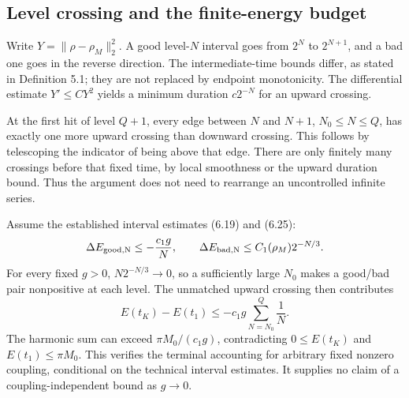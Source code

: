 \documentclass[10pt]{article}
\begin{document}
\subsection*{Level crossing and the finite-energy budget}
Write \(Y=\|\rho-\rho_M\|_2^2\). A good level-\(N\) interval goes from \(2^N\) to \(2^{N+1}\), and a bad one goes in the reverse direction. The intermediate-time bounds differ, as stated in Definition 5.1; they are not replaced by endpoint monotonicity. The differential estimate \(Y'\le CY^2\) yields a minimum duration \(c2^{-N}\) for an upward crossing.\par
At the first hit of level \(Q+1\), every edge between \(N\) and \(N+1\), \(N_0\le N\le Q\), has exactly one more upward crossing than downward crossing. This follows by telescoping the indicator of being above that edge. There are only finitely many crossings before that fixed time, by local smoothness or the upward duration bound. Thus the argument does not need to rearrange an uncontrolled infinite series.\par
Assume the established interval estimates (6.19) and (6.25): \[\Delta E_{\rm good,N}\le-\frac{c_1g}{N},\qquad
 \Delta E_{\rm bad,N}\le C_1(\rho_M)2^{-N/3}.\] For every fixed \(g>0\), \(N2^{-N/3}\to0\), so a sufficiently large \(N_0\) makes a good/bad pair nonpositive at each level. The unmatched upward crossing then contributes \[E(t_K)-E(t_1)\le-c_1g\sum_{N=N_0}^{Q}\frac1N.\] The harmonic sum can exceed \(\pi M_0/(c_1g)\), contradicting \(0\le E(t_K)\) and \(E(t_1)\le\pi M_0\). This verifies the terminal accounting for arbitrary fixed nonzero coupling, conditional on the technical interval estimates. It supplies no claim of a coupling-independent bound as \(g\to0\).\par
\end{document}
